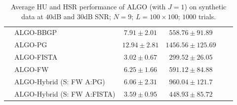 \begin{table}[h]
\begin{adjustbox}{max width=\textwidth}
\begin{tabular}{|c|l|c|c|c|c|}
                    & ALGO-BBGP                  & $7.91     \pm 2.01$   & $558.76   \pm 91.89$   \tabularnewline
                    & ALGO-PG                    & $12.94    \pm 2.81$   & $1456.56  \pm 125.69$  \tabularnewline
                    & ALGO-FISTA                 & $3.02     \pm 0.67$   & $299.52   \pm 26.05$   \tabularnewline
                    & ALGO-FW                    & $6.25     \pm 1.66$   & $591.12   \pm 84.88$   \tabularnewline
                    & ALGO-Hybrid (S: FW A:PG)   & $6.06     \pm 2.31$   & $960.04   \pm 121.7$   \tabularnewline
                    & ALGO-Hybrid (S: FW A:FISTA)& $3.59     \pm 0.95$   & $448.93   \pm 85.72$   \tabularnewline \cline{1-4}
\end{tabular}
\end{adjustbox}
\caption{Average HU and HSR performance of ALGO (with $J=1$) on synthetic
         data at $40$dB and $30$dB SNR; $N = 9$; $L = 100 \times 100$; $1000$
         trials.}
\label{table:results_full_MO9_SNR4030dB_J1}
\end{table}

\newpage

